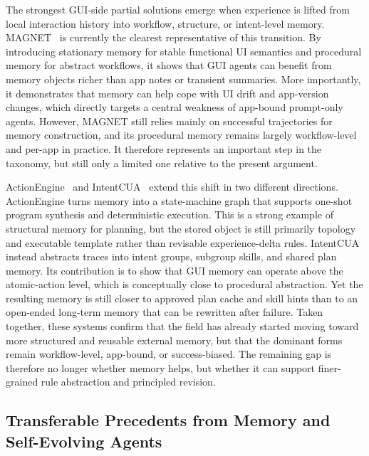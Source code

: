 \documentclass{article}
\begin{document}
The strongest GUI-side partial solutions emerge when experience is
lifted from local interaction history into workflow, structure, or
intent-level memory. MAGNET~\parencite{sun2026magnetadaptiveguiagents} is currently the
clearest representative of this transition. By introducing stationary
memory for stable functional UI semantics and procedural memory for
abstract workflows, it shows that GUI agents can benefit from memory
objects richer than app notes or transient summaries. More importantly,
it demonstrates that memory can help cope with UI drift and app-version
changes, which directly targets a central weakness of app-bound
prompt-only agents. However, MAGNET still relies mainly on successful
trajectories for memory construction, and its procedural memory remains
largely workflow-level and per-app in practice. It therefore represents
an important step in the taxonomy, but still only a limited one
relative to the present argument.

ActionEngine~\parencite{zhong2026actionenginereactiveprogrammaticgui} and
IntentCUA~\parencite{lee2026intentcualearningintentlevelrepresentations} extend this shift in two
different directions. ActionEngine turns memory into a state-machine
graph that supports one-shot program synthesis and deterministic
execution. This is a strong example of structural memory for planning,
but the stored object is still primarily topology and executable
template rather than revisable experience-delta rules. IntentCUA
instead abstracts traces into intent groups, subgroup skills, and
shared plan memory. Its contribution is to show that GUI memory can
operate above the atomic-action level, which is conceptually close to
procedural abstraction. Yet the resulting memory is still closer to
approved plan cache and skill hints than to an open-ended long-term
memory that can be rewritten after failure. Taken together, these
systems confirm that the field has already started moving toward more
structured and reusable external memory, but that the dominant forms
remain workflow-level, app-bound, or success-biased. The remaining gap
is therefore no longer whether memory helps, but whether it can support
finer-grained rule abstraction and principled revision.

\subsection{Transferable Precedents from Memory and Self-Evolving Agents}\label{54-transferable-precedents-from-memory-and-self-evolving-agents}
\end{document}
